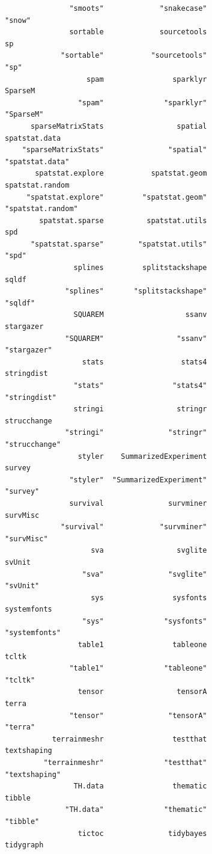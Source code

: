 \documentclass[
  letterpaper,
  DIV=11,
  numbers=noendperiod]{scrreprt}
\begin{document}
\begin{verbatim}
               "smoots"             "snakecase"                  "snow" 
               sortable             sourcetools                      sp 
             "sortable"           "sourcetools"                    "sp" 
                   spam                sparklyr                 SparseM 
                 "spam"              "sparklyr"               "SparseM" 
      sparseMatrixStats                 spatial           spatstat.data 
    "sparseMatrixStats"               "spatial"         "spatstat.data" 
       spatstat.explore           spatstat.geom         spatstat.random 
     "spatstat.explore"         "spatstat.geom"       "spatstat.random" 
        spatstat.sparse          spatstat.utils                     spd 
      "spatstat.sparse"        "spatstat.utils"                   "spd" 
                splines         splitstackshape                   sqldf 
              "splines"       "splitstackshape"                 "sqldf" 
                SQUAREM                   ssanv               stargazer 
              "SQUAREM"                 "ssanv"             "stargazer" 
                  stats                  stats4              stringdist 
                "stats"                "stats4"            "stringdist" 
                stringi                 stringr             strucchange 
              "stringi"               "stringr"           "strucchange" 
                 styler    SummarizedExperiment                  survey 
               "styler"  "SummarizedExperiment"                "survey" 
               survival               survminer                survMisc 
             "survival"             "survminer"              "survMisc" 
                    sva                 svglite                  svUnit 
                  "sva"               "svglite"                "svUnit" 
                    sys                sysfonts             systemfonts 
                  "sys"              "sysfonts"           "systemfonts" 
                 table1                tableone                   tcltk 
               "table1"              "tableone"                 "tcltk" 
                 tensor                 tensorA                   terra 
               "tensor"               "tensorA"                 "terra" 
           terrainmeshr                testthat             textshaping 
         "terrainmeshr"              "testthat"           "textshaping" 
                TH.data                thematic                  tibble 
              "TH.data"              "thematic"                "tibble" 
                 tictoc               tidybayes               tidygraph 

\end{verbatim}
\end{document}
